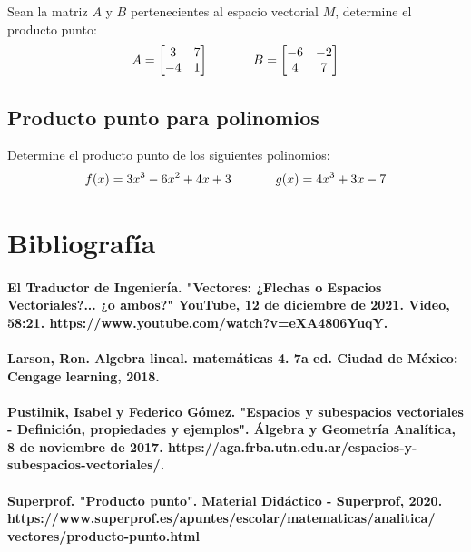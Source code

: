 \documentclass{article}
\begin{document}
            Sean la matriz $A$ y $B$ pertenecientes al espacio vectorial $M$, determine el producto punto:
            \begin{gather*}
                A = \begin{bmatrix}
                    3  & 7 \\
                    -4 & 1
                \end{bmatrix} \hspace*{35 pt}
                B = \begin{bmatrix}
                    -6 & -2 \\
                    4  & 7
                \end{bmatrix}
            \end{gather*}
    
    \subsection{Producto punto para polinomios}

        Determine el producto punto de los siguientes polinomios:
        \begin{gather*}
            f(x) = 3x^3 - 6x^2 + 4x + 3 \hspace*{35 pt}
            g(x) = 4x^3 + 3x - 7
        \end{gather*}

\pagebreak
    
\section*{Bibliografía}
    
    \paragraph{El Traductor de Ingeniería. "Vectores: ¿Flechas o Espacios Vectoriales?... ¿o ambos?" YouTube, 12 de diciembre de 2021. Video, 58:21. https://www.youtube.com/watch?v=eXA4806YuqY.}
    
    \paragraph{Larson, Ron. Algebra lineal. matemáticas 4. 7a ed. Ciudad de México: Cengage learning, 2018.}
    
    \paragraph{Pustilnik, Isabel y Federico Gómez. "Espacios y subespacios vectoriales - Definición, propiedades y ejemplos". Álgebra y Geometría Analítica, 8 de noviembre de 2017. https://aga.frba.utn.edu.ar/espacios-y-subespacios-vectoriales/.}
    
    \paragraph{Superprof. "Producto punto". Material Didáctico - Superprof, 2020. https://www.superprof.es/apuntes/escolar/matematicas/analitica/\\
    vectores/producto-punto.html}
    
\end{document}
